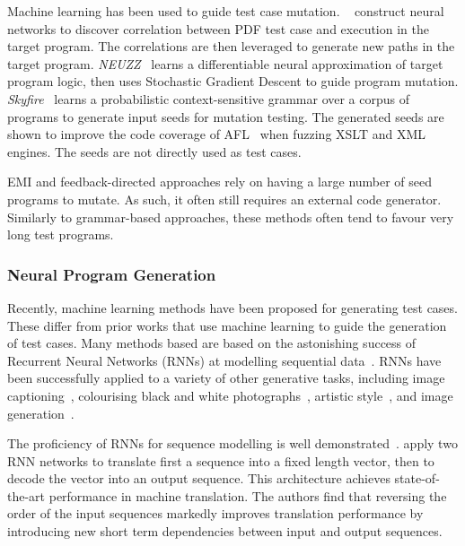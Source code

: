 Machine learning has been used to guide test case mutation.
\citeauthor{Cheng2019}~\cite{Cheng2019} construct neural networks to discover correlation between PDF test case and execution in the target program. The correlations are then leveraged to generate new paths in the target program.
\emph{NEUZZ}~\cite{She2018} learns a differentiable neural approximation of target program logic, then uses Stochastic Gradient Descent to guide program mutation.
\emph{Skyfire}~\cite{Wang2017c} learns a probabilistic context-sensitive grammar over a corpus of programs to generate input seeds for mutation testing. The generated seeds are shown to improve the code coverage of AFL~\cite{Zalewski} when fuzzing XSLT and XML engines. The seeds are not directly used as test cases.

EMI and feedback-directed approaches rely on having a large number of seed programs to mutate. As such, it often still requires an external code generator. Similarly to grammar-based approaches, these methods often tend to favour very long test programs.


\subsubsection{Neural Program Generation}
\label{subsec:related-work-neural-program-generation}

Recently, machine learning methods have been proposed for generating test cases. These differ from prior works that use machine learning to guide the generation of test cases.
Many methods based are based on the astonishing success of Recurrent Neural Networks (RNNs) at modelling sequential data~\cite{Jozefowicz2016a}. RNNs have been successfully applied to a variety of other generative tasks, including image captioning~\cite{Vinyals}, colourising black and white photographs~\cite{Zhang2016}, artistic style~\cite{Gatys2015}, and image generation~\cite{Gregor2014}.

The proficiency of RNNs for sequence modelling is well demonstrated~\cite{Sutskever2014}. \citeauthor{Sutskever2014} apply two RNN networks to translate first a sequence into a fixed length vector, then to decode the vector into an output sequence. This architecture achieves state-of-the-art performance in machine translation. The authors find that reversing the order of the input sequences markedly improves translation performance by introducing new short term dependencies between input and output sequences.

